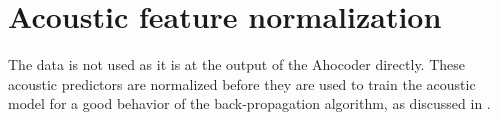 \section{Acoustic feature normalization}

The data is not used as it is at the output of the Ahocoder directly. These acoustic predictors are normalized before they are used to train the acoustic model for a good behavior of the back-propagation algorithm, as discussed in \cite{pascual2016deep}.

